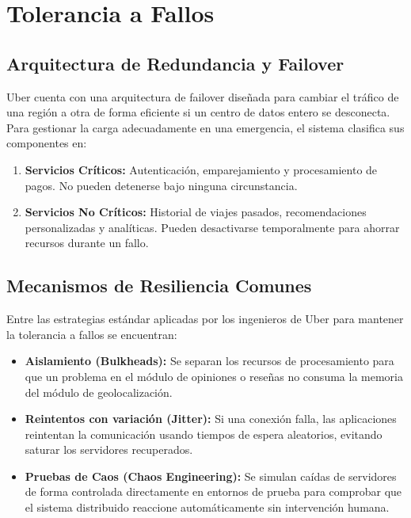 \documentclass[12pt,a4paper]{article}
\begin{document}
\section{Tolerancia a Fallos}

\subsection{Arquitectura de Redundancia y Failover}
Uber cuenta con una arquitectura de failover diseñada para cambiar el tráfico de una región a otra de forma eficiente si un centro de datos entero se desconecta. Para gestionar la carga adecuadamente en una emergencia, el sistema clasifica sus componentes en:
\begin{enumerate}
  \item \textbf{Servicios Críticos:} Autenticación, emparejamiento y procesamiento de pagos. No pueden detenerse bajo ninguna circunstancia.
  \item \textbf{Servicios No Críticos:} Historial de viajes pasados, recomendaciones personalizadas y analíticas. Pueden desactivarse temporalmente para ahorrar recursos durante un fallo.
\end{enumerate}

\subsection{Mecanismos de Resiliencia Comunes}
Entre las estrategias estándar aplicadas por los ingenieros de Uber para mantener la tolerancia a fallos se encuentran:
\begin{itemize}
  \item \textbf{Aislamiento (Bulkheads):} Se separan los recursos de procesamiento para que un problema en el módulo de opiniones o reseñas no consuma la memoria del módulo de geolocalización.
  \item \textbf{Reintentos con variación (Jitter):} Si una conexión falla, las aplicaciones reintentan la comunicación usando tiempos de espera aleatorios, evitando saturar los servidores recuperados.
  \item \textbf{Pruebas de Caos (Chaos Engineering):} Se simulan caídas de servidores de forma controlada directamente en entornos de prueba para comprobar que el sistema distribuido reaccione automáticamente sin intervención humana.
\end{itemize}
\end{document}
